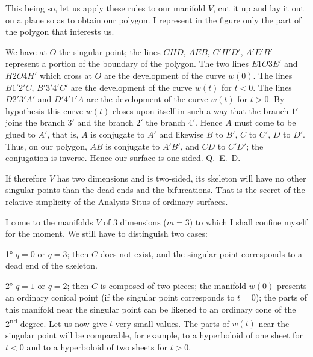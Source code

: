 \documentclass{article}
\begin{document}

This being so, let us apply these rules to our manifold $V$, cut it up and lay it out on a plane so as to obtain our polygon. I represent in the figure only the part of the polygon that interests us.


We have at $O$ the singular point; the lines $CHD$, $AEB$, $C'H'D'$, $A'E'B'$ represent a portion of the boundary of the polygon. The two lines $E1O3E'$ and $H2O4H'$ which cross at $O$ are the development of the curve $w(0)$. The lines $B1'2'C$, $B'3'4'C'$ are the development of the curve $w(t)$ for $t < 0$. The lines $D2'3'A'$ and $D'4'1'A$ are the development of the curve $w(t)$ for $t > 0$. By hypothesis this curve $w(t)$ closes upon itself in such a way that the branch $1'$ joins the branch $3'$ and the branch $2'$ the branch $4'$. Hence $A$ must come to be glued to $A'$, that is, $A$ is conjugate to $A'$ and likewise $B$ to $B'$, $C$ to $C'$, $D$ to $D'$. Thus, on our polygon, $AB$ is conjugate to $A'B'$, and $CD$ to $C'D'$; the conjugation is inverse. Hence our surface is one-sided. Q.~E.~D.

If therefore $V$ has two dimensions and is two-sided, its skeleton will have no other singular points than the dead ends and the bifurcations. That is the secret of the relative simplicity of the Analysis Situs of ordinary surfaces.

I come to the manifolds $V$ of 3 dimensions ($m = 3$) to which I shall confine myself for the moment. We still have to distinguish two cases:

1° $q = 0$ or $q = 3$; then $C$ does not exist, and the singular point corresponds to a dead end of the skeleton.

2° $q = 1$ or $q = 2$; then $C$ is composed of two pieces; the manifold $w(0)$ presents an ordinary conical point (if the singular point corresponds to $t = 0$); the parts of this manifold near the singular point can be likened to an ordinary cone of the 2\textsuperscript{nd} degree. Let us now give $t$ very small values. The parts of $w(t)$ near the singular point will be comparable, for example, to a hyperboloid of one sheet for $t < 0$ and to a hyperboloid of two sheets for $t > 0$.
\end{document}
